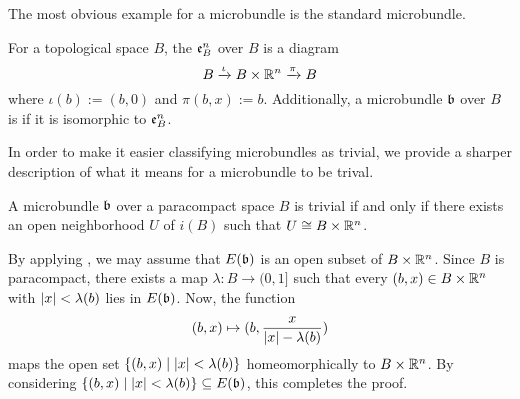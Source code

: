 \begin{myparagraph}
    The most obvious example for a microbundle is the standard microbundle.
\end{myparagraph}

\begin{myexample}
    For a topological space $B$, the  $\mathfrak{e}^{n}_B$ over $B$ is a diagram
    \[ B \xrightarrow{\iota} B \times \mathbb{R}^n \xrightarrow{\pi} B{} \]
    where $\iota(b) := (b, 0)$ and $\pi(b, x) := b$.
    Additionally, a microbundle $\mathfrak{b}$ over $B$ is  if it is isomorphic to $\mathfrak{e}^{n}_B$.
\end{myexample}

\begin{myparagraph}
    In order to make it easier classifying microbundles as trivial,
    we provide a sharper description of what it means for a microbundle to be trival. 
\end{myparagraph}

\begin{mylemma}
    A microbundle $\mathfrak{b}$ over a paracompact space $B$ is trivial if and only if there exists an open neighborhood $U$ of $i(B)$ such that $U \cong B \times \mathbb{R}^n$.
\end{mylemma}
\begin{myproof}
    By applying , we may assume that $E(\mathfrak{b})$ is an open subset of $B \times \mathbb{R}^n$.
    Since $B$ is paracompact, there exists a map $\lambda: B \to (0, 1]$ such that every $(b, x) \in B \times \mathbb{R}^n$ with $\vert{} x \vert{} < \lambda(b)$ lies in $E(\mathfrak{b})$.
    Now, the function
    \[ (b, x) \mapsto (b, \frac{x}{\vert{} x \vert{} - \lambda(b)}) \]
    maps the open set $\{(b, x) \mid \vert{} x \vert{} < \lambda(b)\}$ homeomorphically to $B \times \mathbb{R}^n$.
    By considering $\{(b, x) \mid \vert{} x \vert{} < \lambda(b)\} \subseteq{} E(\mathfrak{b})$, this completes the proof.
\end{myproof}